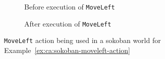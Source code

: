 \documentclass[\master/Master.tex]{subfiles}
\begin{document}
\begin{figure}
    \hspace*{0.1\textwidth}%
    \begin{subfigure}{0.35\textwidth}
        \centering
        \resizebox{\linewidth}{!}{}
        \caption{Before execution of \texttt{MoveLeft}}
    \end{subfigure}%
    \hspace*{0.1\textwidth}%
    \begin{subfigure}{0.35\textwidth}
        \centering
        \resizebox{\linewidth}{!}{}
        \caption{After execution of \texttt{MoveLeft}}
    \end{subfigure}
    \hspace*{0.1\textwidth}
	\caption{\label{fig:ca:sokoban-moveleft-action}\texttt{MoveLeft} action being used in a sokoban world for Example~\ref{ex:ca:sokoban-moveleft-action} }

\end{figure}
\end{document}
